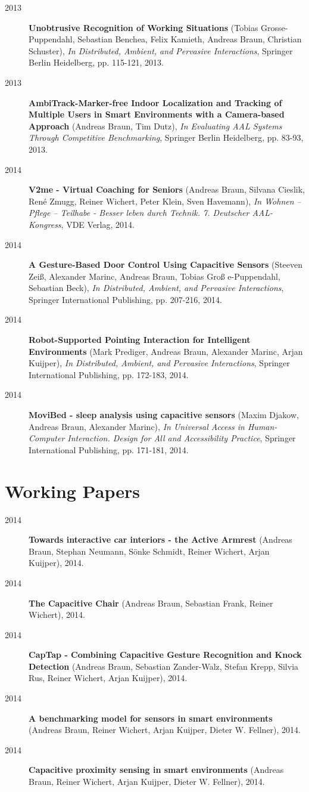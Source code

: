 \begin{appendix}
\begin{description}
\item[2013]{\bf Unobtrusive Recognition of Working Situations} (Tobias Grosse-Puppendahl, Sebastian Benchea, Felix Kamieth, Andreas Braun, Christian Schuster), {\em In Distributed, Ambient, and Pervasive Interactions}, Springer Berlin Heidelberg, pp. 115-121, 2013.
\item[2013]{\bf AmbiTrack-Marker-free Indoor Localization and Tracking of Multiple Users in Smart Environments with a Camera-based Approach} (Andreas Braun, Tim Dutz), {\em In Evaluating AAL Systems Through Competitive Benchmarking}, Springer Berlin Heidelberg, pp. 83-93, 2013.
\item[2014]{\bf V2me - Virtual Coaching for Seniors} (Andreas Braun, Silvana Cieslik, René Zmugg, Reiner Wichert, Peter Klein, Sven Havemann), {\em In Wohnen – Pflege – Teilhabe - Besser leben durch Technik. 7. Deutscher AAL-Kongress}, VDE Verlag, 2014.
\item[2014]{\bf A Gesture-Based Door Control Using Capacitive Sensors} (Steeven Zeiß, Alexander Marinc, Andreas Braun, Tobias Groß e-Puppendahl, Sebastian Beck), {\em In Distributed, Ambient, and Pervasive Interactions}, Springer International Publishing, pp. 207-216, 2014.
\item[2014]{\bf Robot-Supported Pointing Interaction for Intelligent Environments} (Mark Prediger, Andreas Braun, Alexander Marinc, Arjan Kuijper), {\em In Distributed, Ambient, and Pervasive Interactions}, Springer International Publishing, pp. 172-183, 2014.
\item[2014]{\bf MoviBed - sleep analysis using capacitive sensors} (Maxim Djakow, Andreas Braun, Alexander Marinc), {\em In Universal Access in Human-Computer Interaction. Design for All and Accessibility Practice}, Springer International Publishing, pp. 171-181, 2014.
\end{description}
\section*{Working Papers}
\begin{description}
\item[2014]{\bf Towards interactive car interiors - the Active Armrest} (Andreas Braun, Stephan Neumann, Sönke Schmidt, Reiner Wichert, Arjan Kuijper), 2014.
\item[2014]{\bf The Capacitive Chair} (Andreas Braun, Sebastian Frank, Reiner Wichert), 2014.
\item[2014]{\bf CapTap - Combining Capacitive Gesture Recognition and Knock Detection} (Andreas Braun, Sebastian Zander-Walz, Stefan Krepp, Silvia Rus, Reiner Wichert, Arjan Kuijper), 2014.
\item[2014]{\bf A benchmarking model for sensors in smart environments} (Andreas Braun, Reiner Wichert, Arjan Kuijper, Dieter W. Fellner), 2014.
\item[2014]{\bf Capacitive proximity sensing in smart environments} (Andreas Braun, Reiner Wichert, Arjan Kuijper, Dieter W. Fellner), 2014.
\end{description}


\end{appendix}
